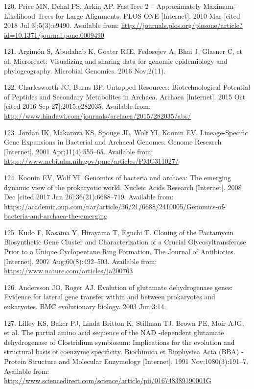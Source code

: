 \documentclass[12pt,twoside]{reedthesis}
\begin{document}
  \hypertarget{ref-price_fasttree_2010}{}
  120. Price MN, Dehal PS, Arkin AP. FastTree 2 -- Approximately
  Maximum-Likelihood Trees for Large Alignments. PLOS ONE {[}Internet{]}.
  2010 Mar {[}cited 2018 Jul 3{]};5(3):e9490. Available from:
  \url{http://journals.plos.org/plosone/article?id=10.1371/journal.pone.0009490}
  
  \hypertarget{ref-argimon_microreact_2016}{}
  121. Argimón S, Abudahab K, Goater RJE, Fedosejev A, Bhai J, Glasner C,
  et al. Microreact: Visualizing and sharing data for genomic epidemiology
  and phylogeography. Microbial Genomics. 2016 Nov;2(11).
  
  \hypertarget{ref-charlesworth_untapped_2015}{}
  122. Charlesworth JC, Burns BP. Untapped Resources: Biotechnological
  Potential of Peptides and Secondary Metabolites in Archaea. Archaea
  {[}Internet{]}. 2015 Oct {[}cited 2016 Sep 27{]};2015:e282035. Available
  from: \url{http://www.hindawi.com/journals/archaea/2015/282035/abs/}
  
  \hypertarget{ref-jordan_lineage-specific_2001}{}
  123. Jordan IK, Makarova KS, Spouge JL, Wolf YI, Koonin EV.
  Lineage-Specific Gene Expansions in Bacterial and Archaeal Genomes.
  Genome Research {[}Internet{]}. 2001 Apr;11(4):555--65. Available from:
  \url{https://www.ncbi.nlm.nih.gov/pmc/articles/PMC311027/}
  
  \hypertarget{ref-koonin_genomics_2008}{}
  124. Koonin EV, Wolf YI. Genomics of bacteria and archaea: The emerging
  dynamic view of the prokaryotic world. Nucleic Acids Research
  {[}Internet{]}. 2008 Dec {[}cited 2017 Jan 26{]};36(21):6688--719.
  Available from:
  \url{https://academic.oup.com/nar/article/36/21/6688/2410005/Genomics-of-bacteria-and-archaea-the-emerging}
  
  \hypertarget{ref-kudo_cloning_2007}{}
  125. Kudo F, Kasama Y, Hirayama T, Eguchi T. Cloning of the Pactamycin
  Biosynthetic Gene Cluster and Characterization of a Crucial
  Glycosyltransferase Prior to a Unique Cyclopentane Ring Formation. The
  Journal of Antibiotics {[}Internet{]}. 2007 Aug;60(8):492--503.
  Available from: \url{https://www.nature.com/articles/ja200763}
  
  \hypertarget{ref-andersson_evolution_2003}{}
  126. Andersson JO, Roger AJ. Evolution of glutamate dehydrogenase genes:
  Evidence for lateral gene transfer within and between prokaryotes and
  eukaryotes. BMC evolutionary biology. 2003 Jun;3:14.
  
  \hypertarget{ref-lilley_partial_1991}{}
  127. Lilley KS, Baker PJ, Linda Britton K, Stillman TJ, Brown PE, Moir
  AJG, et al. The partial amino acid sequence of the NAD -dependent
  glutamate dehydrogenase of Clostridium symbiosum: Implications for the
  evolution and structural basis of coenzyme specificity. Biochimica et
  Biophysica Acta (BBA) - Protein Structure and Molecular Enzymology
  {[}Internet{]}. 1991 Nov;1080(3):191--7. Available from:
  \url{http://www.sciencedirect.com/science/article/pii/016748389190001G}
  
\end{document}

